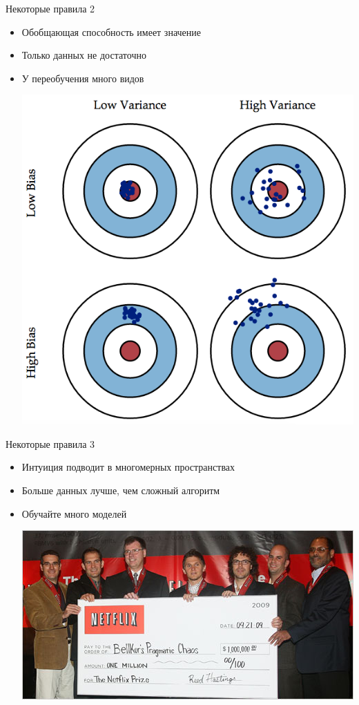\documentclass[aspectratio=169]{beamer}
\begin{document}
\begin{frame}{Некоторые правила 2}

\begin{itemize}
\item Обобщающая способность имеет значение
\item Только данных не достаточно
\item У переобучения много видов
\begin{center}
\includegraphics[scale=0.25]{images/bvd.png}
\end{center}
\end{itemize}

\end{frame}

\begin{frame}{Некоторые правила 3}

\begin{itemize}
\item Интуиция подводит в многомерных пространствах
\item Больше данных лучше, чем сложный алгоритм
\item Обучайте много моделей
\begin{center}
\includegraphics[scale=0.4]{images/netfilx.jpg}
\end{center}
\end{itemize}

\end{frame}
\end{document}
